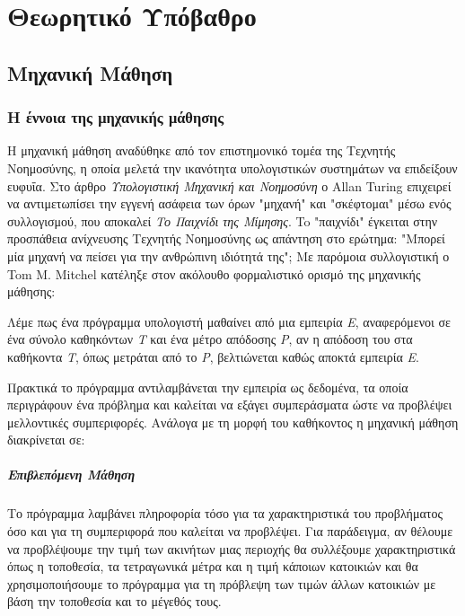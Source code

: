 \chapter{ Θεωρητικό Υπόβαθρο}
\section{Μηχανική Μάθηση}
\subsection{Η έννοια της μηχανικής μάθησης}
Η μηχανική μάθηση αναδύθηκε από τον επιστημονικό τομέα της Τεχνητής Νοημοσύνης, η οποία μελετά την ικανότητα υπολογιστικών συστημάτων να επιδείξουν ευφυΐα. Στο άρθρο \textit{Υπολογιστική Μηχανική και Νοημοσύνη} \citep{Turing:1995:CMI:216408.216410} ο Allan Turing επιχειρεί να αντιμετωπίσει την εγγενή ασάφεια των όρων "μηχανή" και "σκέφτομαι" μέσω ενός συλλογισμού, που αποκαλεί \textit{Το Παιχνίδι της Μίμησης}. To "παιχνίδι" έγκειται στην προσπάθεια ανίχνευσης Τεχνητής Νοημοσύνης ως απάντηση στο ερώτημα: "Μπορεί μία μηχανή να πείσει για την ανθρώπινη ιδιότητά της"; Με παρόμοια συλλογιστική ο Tom M. Mitchel \citep{Mitchell:1997:ML:541177} κατέληξε στον ακόλουθο φορμαλιστικό ορισμό της μηχανικής μάθησης: 

\begin{displayquote}
	Λέμε πως ένα πρόγραμμα υπολογιστή μαθαίνει από μια εμπειρία \textit{Ε}, αναφερόμενοι σε ένα σύνολο καθηκόντων \textit{Τ} και ένα μέτρο απόδοσης \textit{P}, αν η απόδοση του στα καθήκοντα \textit{T}, όπως μετράται από το \textit{P}, βελτιώνεται καθώς αποκτά εμπειρία \textit{Ε}.
\end{displayquote}

Πρακτικά το πρόγραμμα αντιλαμβάνεται την εμπειρία ως δεδομένα, τα οποία περιγράφουν ένα πρόβλημα και καλείται να εξάγει συμπεράσματα ώστε να προβλέψει μελλοντικές συμπεριφορές. Ανάλογα με τη μορφή του καθήκοντος η μηχανική μάθηση διακρίνεται σε:

\paragraph{Επιβλεπόμενη Μάθηση} Το πρόγραμμα λαμβάνει πληροφορία τόσο για τα χαρακτηριστικά του προβλήματος όσο και για τη συμπεριφορά που καλείται να προβλέψει. Για παράδειγμα, αν θέλουμε να προβλέψουμε την τιμή των ακινήτων μιας περιοχής θα συλλέξουμε χαρακτηριστικά όπως η τοποθεσία, τα τετραγωνικά μέτρα και η τιμή κάποιων κατοικιών και θα χρησιμοποιήσουμε το πρόγραμμα για τη πρόβλεψη των τιμών άλλων κατοικιών με βάση την τοποθεσία και το μέγεθός τους.

